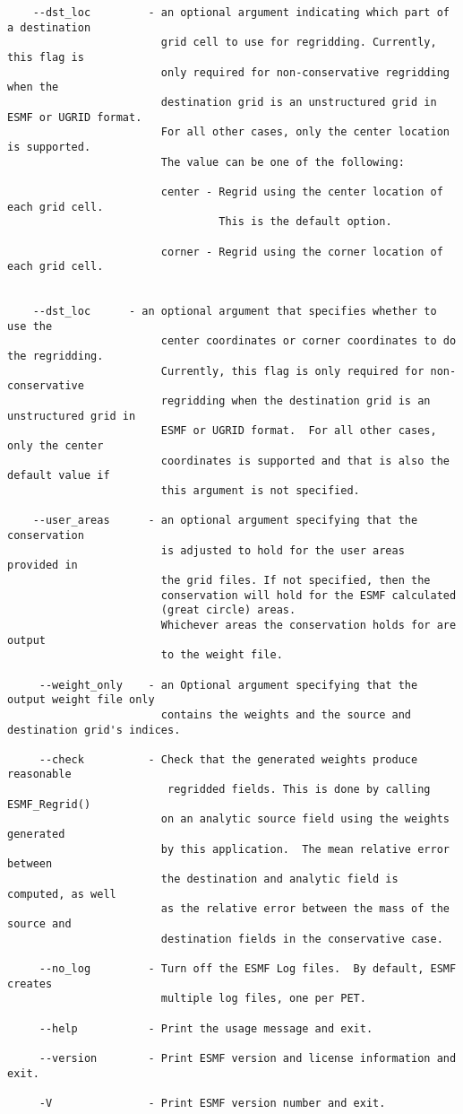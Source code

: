 \begin{verbatim}
    --dst_loc         - an optional argument indicating which part of a destination
                        grid cell to use for regridding. Currently, this flag is 
                        only required for non-conservative regridding when the 
                        destination grid is an unstructured grid in ESMF or UGRID format.
                        For all other cases, only the center location is supported.
                        The value can be one of the following:

                        center - Regrid using the center location of each grid cell. 
                                 This is the default option. 

                        corner - Regrid using the corner location of each grid cell. 


    --dst_loc      - an optional argument that specifies whether to use the 
                        center coordinates or corner coordinates to do the regridding.
                        Currently, this flag is only required for non-conservative
                        regridding when the destination grid is an unstructured grid in 
                        ESMF or UGRID format.  For all other cases, only the center
                        coordinates is supported and that is also the default value if
                        this argument is not specified.

    --user_areas      - an optional argument specifying that the conservation
                        is adjusted to hold for the user areas provided in
                        the grid files. If not specified, then the 
                        conservation will hold for the ESMF calculated 
                        (great circle) areas.
                        Whichever areas the conservation holds for are output
                        to the weight file.

     --weight_only    - an Optional argument specifying that the output weight file only 
                        contains the weights and the source and destination grid's indices.

     --check          - Check that the generated weights produce reasonable 
                         regridded fields. This is done by calling ESMF_Regrid() 
                        on an analytic source field using the weights generated 
                        by this application.  The mean relative error between 
                        the destination and analytic field is computed, as well 
                        as the relative error between the mass of the source and 
                        destination fields in the conservative case.

     --no_log         - Turn off the ESMF Log files.  By default, ESMF creates 
                        multiple log files, one per PET.

     --help           - Print the usage message and exit.

     --version        - Print ESMF version and license information and exit.

     -V               - Print ESMF version number and exit.
\end{verbatim}



